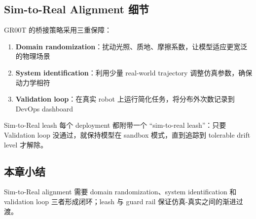 \subsection{Sim-to-Real Alignment 细节}

GR00T 的桥接策略采用三重保障：

\begin{enumerate}
    \item \textbf{Domain randomization}：扰动光照、质地、摩擦系数，让模型适应更宽泛的物理场景
    \item \textbf{System identification}：利用少量 real-world trajectory 调整仿真参数，确保动力学相符
    \item \textbf{Validation loop}：在真实 robot 上运行简化任务，将分布外次数记录到 DevOps dashboard
\end{enumerate}

\begin{importantbox}{Sim-to-Real leash}
每个 deployment 都附带一个 ``sim-to-real leash''：只要 Validation loop 没通过，就保持模型在 sandbox 模式，直到追踪到 tolerable drift level 才解除。
\end{importantbox}

\subsection{本章小结}

Sim-to-Real alignment 需要 domain randomization、system identification 和 validation loop 三者形成闭环；leash 与 guard rail 保证仿真-真实之间的渐进过渡。

